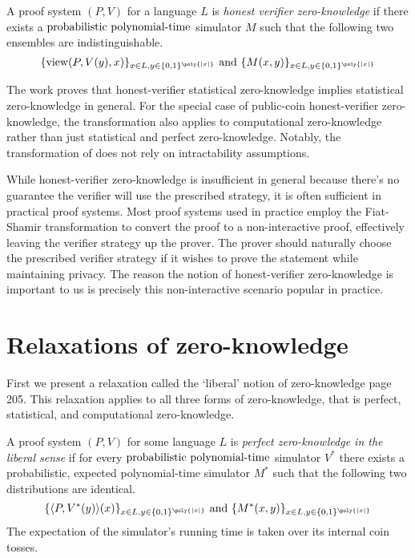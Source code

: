 \begin{definition}
    A proof system $(P,V)$ for a language $L$ is \emph{honest verifier zero-knowledge} if there exists a $\text{probabilistic polynomial-time}$ simulator $M$ such that the following two ensembles are indistinguishable.
    \begin{equation}
        \{ \text{view}(P, V(y), x) \}_{x\in L, y\in\{0,1\}^{\poly{|x|}}}
        \text{ and }
        \{ M(x,y) \}_{x\in L, y\in\{0,1\}^{\poly{|x|}}}
    \end{equation}
\end{definition}

The work \cite{GSV98} proves that honest-verifier statistical zero-knowledge implies statistical zero-knowledge in general.
For the special case of public-coin honest-verifier zero-knowledge, the transformation also applies to computational zero-knowledge rather than just statistical and perfect zero-knowledge.
Notably, the transformation of \cite{GSV98} does not rely on intractability assumptions.

While honest-verifier zero-knowledge is insufficient in general because there's no guarantee the verifier will use the prescribed strategy, it is often sufficient in practical proof systems.
Most proof systems used in practice employ the Fiat-Shamir transformation to convert the proof to a non-interactive proof, effectively leaving the verifier strategy up the prover.
The prover should naturally choose the prescribed verifier strategy if it wishes to prove the statement while maintaining privacy.
The reason the notion of honest-verifier zero-knowledge is important to us is precisely this non-interactive scenario popular in practice.


\section{Relaxations of zero-knowledge}

First we present a relaxation called the `liberal' notion of zero-knowledge \cite{Gol01} page 205.
This relaxation applies to all three forms of zero-knowledge, that is perfect, statistical, and computational zero-knowledge.

\begin{definition}
    A proof system $(P,V)$ for some language $L$ is \emph{perfect zero-knowledge in the liberal sense} if for every $\text{probabilistic polynomial-time}$ simulator $V^*$ there exists a probabilistic, expected polynomial-time simulator $M^*$ such that the following two distributions are identical.
    \begin{equation}
        \{ \langle P, V^*(y) \rangle(x) \}_{x\in L, y\in\{0,1\}^{\poly{|x|}}}
        \text{ and }
        \{ M^*(x,y) \}_{x\in L, y\in\{0,1\}^{\poly{|x|}}}
    \end{equation}
    The expectation of the simulator's running time is taken over its internal coin tosses.
\end{definition}

